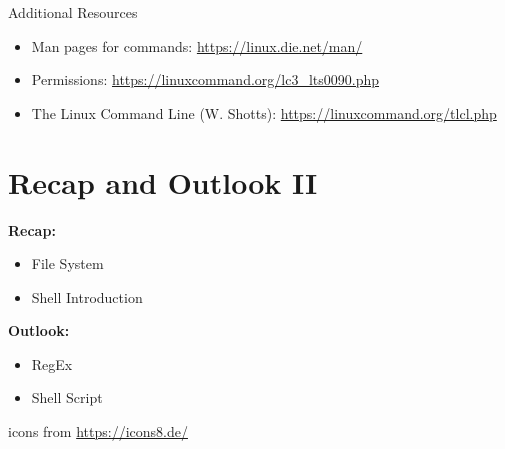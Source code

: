 \documentclass[hyperref={pdfpagelabels=false},aspectratio=169]{beamer}
\begin{document}
\begin{frame}{Additional Resources}
    
    \begin{itemize}
        \item Man pages for commands: \url{https://linux.die.net/man/}
        \item Permissions: \url{https://linuxcommand.org/lc3_lts0090.php}
        \item The Linux Command Line (W. Shotts): \url{https://linuxcommand.org/tlcl.php}

    \end{itemize}
\end{frame}


\section{Recap and Outlook II}

\begin{frame}
	\tableofcontents[currentsection]
\end{frame}

\begin{frame}
\begin{minipage}{0.54\textwidth}
	\textbf{Recap:}
	\begin{itemize}
		\item File System
		\item Shell Introduction
	\end{itemize}

\vspace{15pt}
\textbf{Outlook:}

\begin{itemize}
	\item RegEx
	\item Shell Script
\end{itemize}
\end{minipage}
\hfill
\begin{minipage}{0.45\textwidth}
\begin{center}
    \tiny
    icons from \url{https://icons8.de/}
\end{center}
\end{minipage}

\end{frame}
\end{document}
